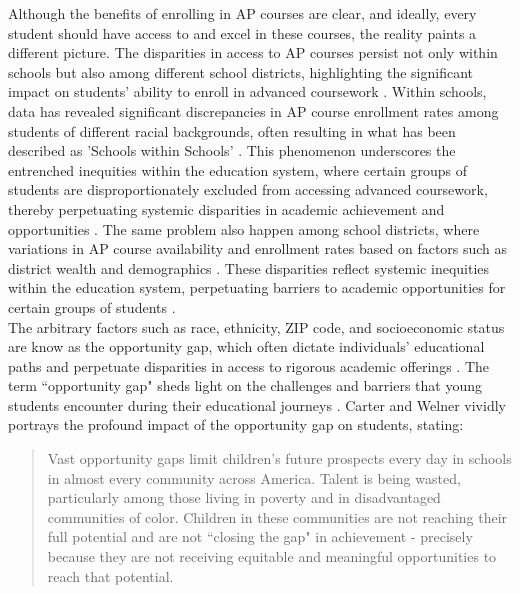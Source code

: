 \documentclass[sn-mathphys-num]{sn-jnl}%
\theoremstyle{thmstyleone}%
\theoremstyle{thmstyletwo}%
\theoremstyle{thmstylethree}%
\begin{document}
Although the benefits of enrolling in AP courses are clear, and ideally, every student should have access to and excel in these courses, the reality paints a different picture. The disparities in access to AP courses persist not only within schools but also among different school districts, highlighting the significant impact on students' ability to enroll in advanced coursework  \cite{solorzano2002critical, colgren2015closing}. Within schools, data has revealed significant discrepancies in AP course enrollment rates among students of different racial backgrounds, often resulting in what has been described as 'Schools within Schools' \cite{solorzano2002critical}. This phenomenon underscores the entrenched inequities within the education system, where certain groups of students are disproportionately excluded from accessing advanced coursework, thereby perpetuating systemic disparities in academic achievement and opportunities \cite{solorzano2002critical}. The same problem also happen among school districts, where variations in AP course availability and enrollment rates based on factors such as district wealth and demographics \cite{carter2013closing}. These disparities reflect systemic inequities within the education system, perpetuating barriers to academic opportunities for certain groups of students \cite{carter2013closing}.\\

The arbitrary factors such as race, ethnicity, ZIP code, and socioeconomic status are know as the opportunity gap, which often dictate individuals' educational paths and perpetuate disparities in access to rigorous academic offerings \cite{carter2013closing}. The term ``opportunity gap" sheds light on the challenges and barriers that young students encounter during their educational journeys \cite{carter2013closing}. Carter and Welner vividly portrays the profound impact of the opportunity gap on students, stating: 
\begin{quote}Vast opportunity gaps limit children's future prospects every day in schools in almost every community across America. Talent is being wasted, particularly among those living in poverty and in disadvantaged communities of color. Children in these communities are not reaching their full potential and are not ``closing the gap" in achievement - precisely because they are not receiving equitable and meaningful opportunities to reach that potential. \cite{carter2013closing}
\end{quote}
\end{document}
